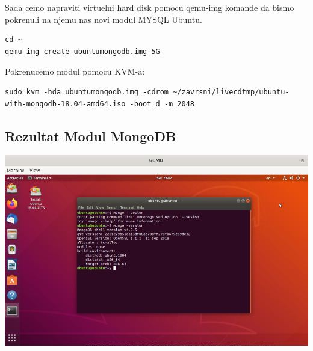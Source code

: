 \documentclass[12pt,vi]{mitthesis}
\begin{document}
\noindent
Sada cemo napraviti virtuelni hard disk pomocu qemu-img komande da bismo pokrenuli na njemu nas novi modul MYSQL Ubuntu.
\begin{lstlisting}[style=BashInputStyle]
cd ~
qemu-img create ubuntumongodb.img 5G
\end{lstlisting}

\noindent 
Pokrenucemo modul pomocu KVM-a:
\begin{lstlisting}[style=BashInputStyle]
sudo kvm -hda ubuntumongodb.img -cdrom ~/zavrsni/livecdtmp/ubuntu-with-mongodb-18.04-amd64.iso -boot d -m 2048
\end{lstlisting}

\subsection*{Rezultat Modul MongoDB}
\includegraphics[width=\linewidth]{images/mongoLive.png} 
\end{document}
